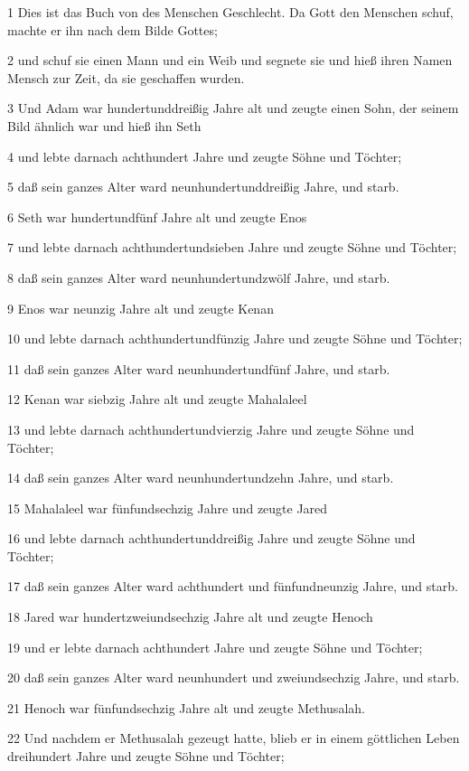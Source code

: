 \par 1 Dies ist das Buch von des Menschen Geschlecht. Da Gott den Menschen schuf, machte er ihn nach dem Bilde Gottes;
\par 2 und schuf sie einen Mann und ein Weib und segnete sie und hieß ihren Namen Mensch zur Zeit, da sie geschaffen wurden.
\par 3 Und Adam war hundertunddreißig Jahre alt und zeugte einen Sohn, der seinem Bild ähnlich war und hieß ihn Seth
\par 4 und lebte darnach achthundert Jahre und zeugte Söhne und Töchter;
\par 5 daß sein ganzes Alter ward neunhundertunddreißig Jahre, und starb.
\par 6 Seth war hundertundfünf Jahre alt und zeugte Enos
\par 7 und lebte darnach achthundertundsieben Jahre und zeugte Söhne und Töchter;
\par 8 daß sein ganzes Alter ward neunhundertundzwölf Jahre, und starb.
\par 9 Enos war neunzig Jahre alt und zeugte Kenan
\par 10 und lebte darnach achthundertundfünzig Jahre und zeugte Söhne und Töchter;
\par 11 daß sein ganzes Alter ward neunhundertundfünf Jahre, und starb.
\par 12 Kenan war siebzig Jahre alt und zeugte Mahalaleel
\par 13 und lebte darnach achthundertundvierzig Jahre und zeugte Söhne und Töchter;
\par 14 daß sein ganzes Alter ward neunhundertundzehn Jahre, und starb.
\par 15 Mahalaleel war fünfundsechzig Jahre und zeugte Jared
\par 16 und lebte darnach achthundertunddreißig Jahre und zeugte Söhne und Töchter;
\par 17 daß sein ganzes Alter ward achthundert und fünfundneunzig Jahre, und starb.
\par 18 Jared war hundertzweiundsechzig Jahre alt und zeugte Henoch
\par 19 und er lebte darnach achthundert Jahre und zeugte Söhne und Töchter;
\par 20 daß sein ganzes Alter ward neunhundert und zweiundsechzig Jahre, und starb.
\par 21 Henoch war fünfundsechzig Jahre alt und zeugte Methusalah.
\par 22 Und nachdem er Methusalah gezeugt hatte, blieb er in einem göttlichen Leben dreihundert Jahre und zeugte Söhne und Töchter;

